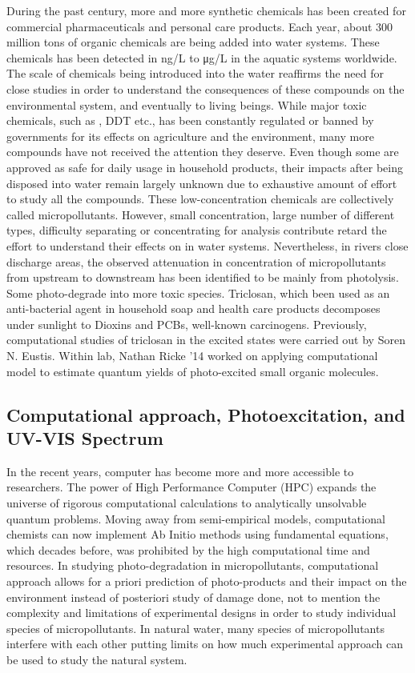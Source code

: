 \documentclass[
journal=jpcbfk, %
manuscript=article]{achemso}
\begin{document}
During the past century, more and more synthetic chemicals has been created for commercial pharmaceuticals and personal care products. Each year, about 300 million tons of organic chemicals are being added into water systems.\cite{Schwarzenbach2006} These chemicals has been detected in ng/L to μg/L in the aquatic systems worldwide.\cite{Monteiro2010} The scale of chemicals being introduced into the water reaffirms the need for close studies in order to understand the consequences of these compounds on the environmental system, and eventually to living beings. While major toxic chemicals, such as , DDT etc., has been constantly regulated or banned by governments for its effects on agriculture and the environment, many more compounds have not received the attention they deserve. Even though some are approved as safe for daily usage in household products, their impacts after being disposed into water remain largely unknown due to exhaustive amount of effort to study all the compounds. These low-concentration chemicals are collectively called micropollutants. However, small concentration, large number of different types, difficulty separating or concentrating for analysis contribute retard the effort to understand their effects on in water systems. Nevertheless, in rivers close discharge areas, the observed attenuation in concentration of micropollutants from upstream to downstream has been identified to be mainly from photolysis.\cite{Conley2008,Daneshvar2010,Bonvin2011,Carlson2015} Some photo-degrade into more toxic species. Triclosan, which been used as an anti-bacterial agent in household soap and health care products decomposes under sunlight to Dioxins and PCBs, well-known carcinogens.\cite{Bedoux2012} Previously, computational studies of triclosan in the excited states were carried out by Soren N. Eustis.\cite{Kliegman2013} Within 
 lab, Nathan Ricke '14 worked on applying computational model to estimate quantum yields of photo-excited small organic molecules.\cite{Ricke2014} 

\subsection{Computational approach, Photoexcitation, and UV-VIS Spectrum}
In the recent years, computer has become more and more accessible to researchers.\cite{Dykstra2011} The power of High Performance Computer (HPC) expands the universe of rigorous computational calculations to analytically unsolvable quantum problems. Moving away from semi-empirical models, computational chemists can now implement Ab Initio methods using fundamental equations, which decades before, was prohibited by the high computational time and resources. In studying photo-degradation in micropollutants, computational approach allows for a priori prediction of photo-products and their impact on the environment instead of posteriori study of damage done, not to mention the complexity and limitations of experimental designs in order to study individual species of micropollutants. In natural water, many species of micropollutants interfere with each other putting limits on how much experimental approach can be used to study the natural system. 
\end{document}
